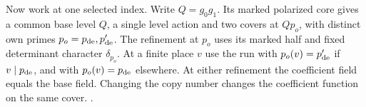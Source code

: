 Now work at one selected index. Write \(Q=g_0g_1\). Its marked
polarized core gives a common base level \(Q\), a single level action
and two covers at \(Qp_o\), with distinct own primes
\(p_o=p_{\rm de},p'_{\rm de}\). The refinement at \(p_o\) uses its
marked half and fixed determinant character \(\delta_{p_o}\). At a
finite place \(v\) use the run with \(p_o(v)=p'_{\rm de}\) if
\(v\mid p_{\rm de}\), and with \(p_o(v)=p_{\rm de}\) elsewhere. At
either refinement the coefficient
field equals the base field. Changing the copy number changes the
coefficient function on the same cover.
.

